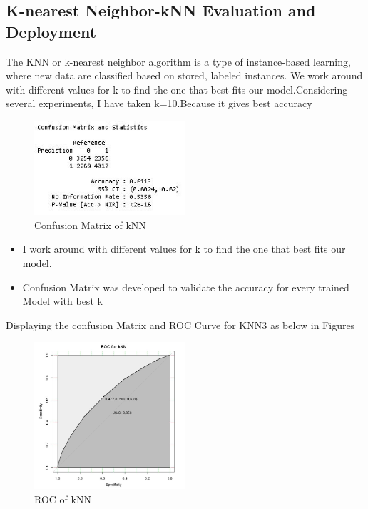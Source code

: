\documentclass[sigchi]{acmart}
\begin{document}
\subsection{K-nearest Neighbor-kNN Evaluation and Deployment}
The KNN or k-nearest neighbor algorithm is a type of instance-based learning, where new data are classified based on stored, labeled instances. We work around with different values for k to find the one that best fits our model.Considering several experiments, I have taken k=10.Because it gives best accuracy
\begin{figure}[h!]
    \caption{Confusion Matrix of kNN}
    \centering
    \includegraphics[width=0.50\textwidth]{ConfusionMatrixand Accuracy of kNN.JPG}
\end{figure}

\begin{itemize}
    \item I work around with different values for k to find the one that best fits our model.
    \item Confusion Matrix was developed  to validate the accuracy for every trained Model with best k
\end{itemize}
Displaying the confusion Matrix and ROC Curve for KNN3 as below in Figures
\begin{figure}[h!]
    \caption{ROC of kNN}
    \centering
    \includegraphics[width=0.50\textwidth]{ROCofKNN.JPG}
\end{figure}
\end{document}
